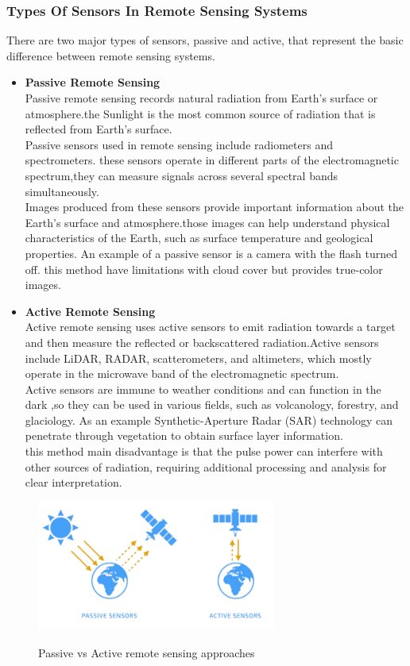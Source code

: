 \subsubsection{Types Of Sensors In Remote Sensing Systems}
There are two major types of sensors, passive and active, that represent the basic difference between remote sensing systems.\cite{zhou2021potential}\cite{heisig2022predicting}
\begin{itemize}
	\item \textbf{Passive Remote Sensing }\\
	Passive remote sensing records natural radiation from Earth's surface or atmosphere.the Sunlight is the most common source of radiation that is reflected from Earth's surface.\\
	Passive sensors used in remote sensing include radiometers and spectrometers. these sensors operate in different parts of the electromagnetic spectrum,they can measure signals across several spectral bands simultaneously.\\\cite{tong2019trends}
	Images produced from these sensors provide important information about the Earth's surface and atmosphere.those images can help understand physical characteristics of the Earth, such as surface temperature and geological properties.
	An example of a passive sensor is a camera with the ﬂash turned off.
	this method have limitations with cloud cover but provides true-color images.\cite{schroeder2019passive}
	
	\item \textbf{Active Remote Sensing }\\
	Active remote sensing uses active sensors to emit radiation towards a target and then measure the reflected or backscattered radiation.Active sensors include LiDAR, RADAR, scatterometers, and altimeters, which mostly operate in the microwave band of the electromagnetic spectrum.\\
	Active sensors are immune to weather conditions and can function in the dark ,so they can be used in various fields, such as volcanology, forestry, and glaciology.
	As an example Synthetic-Aperture Radar (SAR) technology can penetrate through vegetation to obtain surface layer information.\\
	this method main disadvantage is that the pulse power can interfere with other sources of radiation, requiring additional processing and analysis for clear interpretation.\cite{zhou2021potential}
\end{itemize}
\begin{figure}[h]
	\centering
	\includegraphics[width=0.7\textwidth ,height=0.3\textheight]{images chap1/rspa}
	\caption{Passive vs Active remote sensing approaches}\cite{rsap}
\end{figure}

